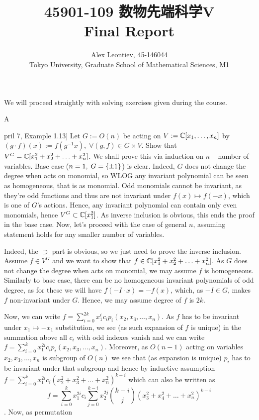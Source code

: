 \documentclass[8pt]{article} %
\title{45901-109 数物先端科学V\\Final Report}
\author{Alex Leontiev, 45-146044
\\Tokyo University, Graduate School of Mathematical Sciences, M1}
\newcommand{\myprobshort}[2]{\begin{myprob}[#1]#2\end{myprob}}
\begin{document}
\begin{CJK}{UTF8}{bsmi}
\maketitle
\end{CJK}
We will proceed straightly with solving exercises given during the course.
\myprobshort[April 7, Example  1.13]{ Let $G:=O(n)$ be acting on $V:=\mathbb{C}[x_1,\hdots,x_n]$ by $(g\cdot f)(x):=
f(g^{ -1 }x),\;\forall (g,f)\in G\times V$. Show that $V^G=\mathbb{C}[x_1^2+x_2^2+\hdots+x_n^2]$.}
We shall prove this via induction on $n$ -- number of variables. Base case ($n=1,\;G=\left\{ \pm1 \right\}$) is clear. Indeed, $G$
does not change the degree when acts on monomial, so WLOG any invariant polynomial can be seen as homogeneous, that is as monomial.
Odd monomials cannot be invariant, as they're odd functions and thus are not invariant under $f(x)\mapsto f(-x)$, which is one
of $G$'s actions. Hence, any invariant polynomial can contain only even monomials, hence $V^G\subset\mathbb{C}[x_1^2]$. As inverse inclusion
is obvious, this ends the proof in the base case. Now, let's proceed with the case of general $n$, assuming statement holds for any
smaller number of variables.\par
Indeed, the $\supset$ part is obvious, so we just need to prove the inverse inclusion. Assume $f\in V^G$ and we want to show
that $f\in\mathbb{C}[x_1^2+x_2^2+\hdots+x_n^2]$. As $G$ does not change the degree when acts on monomial, we may assume $f$ is homogeneous.
Similarly to base case,
there can be no homogeneous invariant polynomials of odd degree, as for these we will have $f(-I\cdot x)=-f(x)$,
which, as $-I\in G$, makes $f$ non-invariant under $G$. Hence, we may assume degree of $f$ is $2k$.\par
Now, we can write $f=\sum_{i=0}^{ 2k }x_1^{ i }c_ip_i(x_2,x_3,\hdots,x_n)$. As $f$ has to be invariant under $x_1\mapsto -x_1$
substitution, we see (as such expansion of $f$ is unique) in the summation above all $c_i$ with odd indexes vanish and we can write
$f=\sum_{i=0}^{ k }x_1^{ 2i }c_ip_i(x_2,x_3,\hdots,x_n)$. Moreover, as $O(n-1)$ acting on variables $x_2,x_3,\hdots,x_n$
is subgroup of $O(n)$ we see that (as expansion is unique) $p_i$ has to be invariant under that subgroup and hence
by inductive assumption $f=\sum_{i=0}^{ k }x_1^{ 2i }c_i(x_2^2+x_3^2+\hdots+x_n^2)^{ k-i }$ which can also be written as
\begin{equation}\label{Prob1}
	f=\sum_{i=0}^{ k }x_1^{ 2i }c_i\sum_{ j=0 }^{ k-i }x_2^{ 2j }\binom{k-i}{j}(x_3^2+x_4^2+\hdots+x_n^2)^{ k-i }
\end{equation}. Now, as permutation
\end{document}
